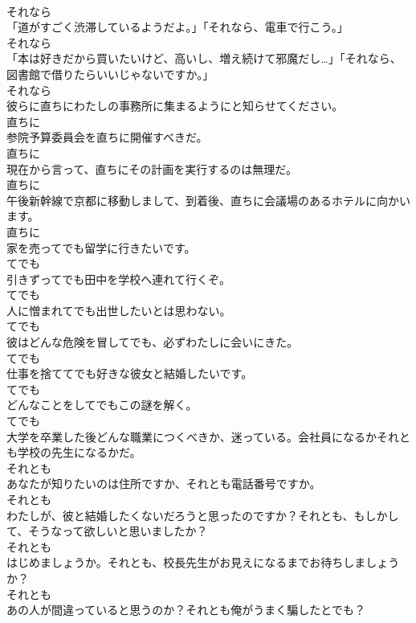 \documentclass[8pt]{extreport}
\begin{document}
\begin{CJK}{UTF8}{min}
\\	それなら
\\	「道がすごく渋滞しているようだよ。」「それなら、電車で行こう。」	
\\	それなら
\\	「本は好きだから買いたいけど、高いし、増え続けて邪魔だし…」「それなら、図書館で借りたらいいじゃないですか。」	
\\	それなら
\\	彼らに直ちにわたしの事務所に集まるようにと知らせてください。	
\\	直ちに
\\	参院予算委員会を直ちに開催すべきだ。	
\\	直ちに
\\	現在から言って、直ちにその計画を実行するのは無理だ。	
\\	直ちに
\\	午後新幹線で京都に移動しまして、到着後、直ちに会議場のあるホテルに向かいます。	
\\	直ちに
\\	家を売ってでも留学に行きたいです。	
\\	てでも
\\	引きずってでも田中を学校へ連れて行くぞ。	
\\	てでも
\\	人に憎まれてでも出世したいとは思わない。	
\\	てでも
\\	彼はどんな危険を冒してでも、必ずわたしに会いにきた。	
\\	てでも
\\	仕事を捨ててでも好きな彼女と結婚したいです。	
\\	てでも
\\	どんなことをしてでもこの謎を解く。	
\\	てでも
\\	大学を卒業した後どんな職業につくべきか、迷っている。会社員になるかそれとも学校の先生になるかだ。	
\\	それとも
\\	あなたが知りたいのは住所ですか、それとも電話番号ですか。	
\\	それとも
\\	わたしが、彼と結婚したくないだろうと思ったのですか？それとも、もしかして、そうなって欲しいと思いましたか？	
\\	それとも
\\	はじめましょうか。それとも、校長先生がお見えになるまでお待ちしましょうか？	
\\	それとも
\\	あの人が間違っていると思うのか？それとも俺がうまく騙したとでも？	

\end{CJK}
\end{document}
